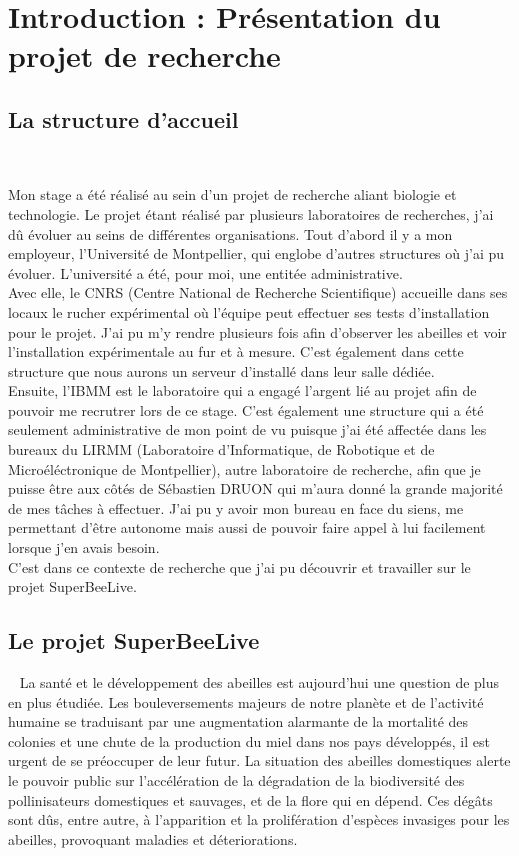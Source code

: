 \documentclass[11pt,french,a4paper]{report}
\begin{document}
\tableofcontents

\clearpage

\chapter{Introduction : Présentation du projet de recherche}
\section{La structure d'accueil} 

Mon stage a été réalisé au sein d'un projet de recherche aliant biologie et technologie. 
Le projet étant réalisé par plusieurs laboratoires de recherches, j'ai dû évoluer au seins de différentes organisations. 
Tout d'abord il y a mon employeur, l'Université de Montpellier, qui englobe d'autres structures où j'ai pu évoluer. 
L'université a été, pour moi, une entitée administrative. \\ 
Avec elle, le CNRS (Centre National de Recherche Scientifique) accueille dans ses locaux le rucher expérimental où 
l'équipe peut effectuer ses tests d'installation pour le projet. J'ai pu m'y rendre plusieurs fois afin d'observer les abeilles
et voir l'installation expérimentale au fur et à mesure. C'est également dans cette structure que nous aurons un serveur 
d'installé dans leur salle dédiée.\\
Ensuite, l'IBMM est le laboratoire qui a engagé l'argent lié au projet afin de pouvoir me recrutrer lors de ce stage. 
C'est également une structure qui a été seulement administrative de mon point de vu puisque j'ai été affectée dans 
les bureaux du LIRMM (Laboratoire d'Informatique, de Robotique et de Microéléctronique de Montpellier), autre laboratoire de 
recherche, afin que je puisse être aux côtés de Sébastien DRUON qui m'aura donné la grande majorité de mes tâches à effectuer. 
J'ai pu y avoir mon bureau en face du siens, me permettant d'être autonome mais aussi de pouvoir faire
appel à lui facilement lorsque j'en avais besoin.\\
C'est dans ce contexte de recherche que j'ai pu découvrir et travailler sur le projet SuperBeeLive. \\ 


\section{Le projet SuperBeeLive}
 
La santé et le développement des abeilles est aujourd’hui une question de plus en plus étudiée. Les bouleversements
majeurs de notre planète et de l’activité humaine se traduisant par une augmentation alarmante de la mortalité
des colonies et une chute de la production du miel dans nos pays développés, il est urgent de se préoccuper de leur futur. 
La situation des abeilles domestiques alerte le pouvoir public sur l’accélération de la dégradation de la biodiversité des 
pollinisateurs domestiques et sauvages, et de la flore qui en dépend. Ces dégâts sont dûs, entre autre, à l’apparition 
et la prolifération d’espèces invasiges pour les abeilles, provoquant maladies et déteriorations. 
\end{document}
